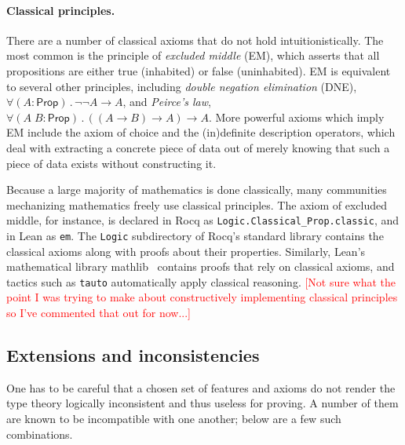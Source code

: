 \documentclass{article}
\newcommand{\note}[1]{\textcolor{red}{[#1]}}
\newcommand{\kw}[1]{\mathsf{#1}}
\newcommand{\code}[1]{\texttt{#1}}
\begin{document}
\paragraph{Classical principles.}
There are a number of classical axioms that do not hold intuitionistically.
The most common is the principle of \emph{excluded middle} (EM),
which asserts that all propositions are either true (inhabited) or false (uninhabited).
EM is equivalent to several other principles,
including \emph{double negation elimination} (DNE),
$\forall (A : \kw{Prop})\mathpunct{.} \neg \neg A \to A$,
and \emph{Peirce's law},
$\forall (A \; B : \kw{Prop})\mathpunct{.} ((A \to B) \to A) \to A$.
More powerful axioms which imply EM include the axiom of choice
and the (in)definite description operators,
which deal with extracting a concrete piece of data
out of merely knowing that such a piece of data exists without constructing it.

Because a large majority of mathematics is done classically,
many communities mechanizing mathematics freely use classical principles.
The axiom of excluded middle, for instance,
is declared in Rocq as \code{Logic.Classical\_Prop.classic},
and in Lean as \code{em}.
The \code{Logic} subdirectory of Rocq's standard library
contains the classical axioms along with proofs about their properties.
Similarly, Lean's mathematical library mathlib~\citep{mathlib}
contains proofs that rely on classical axioms,
and tactics such as \code{tauto} automatically apply classical reasoning.
\note{Not sure what the point I was trying to make
about constructively implementing classical principles
so I've commented that out for now...}

\subsection{Extensions and inconsistencies}

One has to be careful that a chosen set of features and axioms
do not render the type theory logically inconsistent and thus useless for proving.
A number of them are known to be incompatible with one another;
below are a few such combinations.
\end{document}
